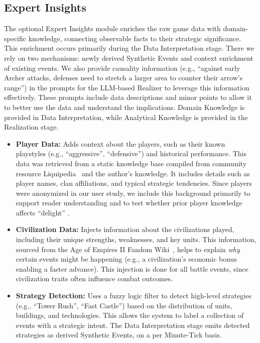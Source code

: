 \subsection{Expert Insights}
The optional Expert Insights module enriches the raw game data with domain-specific knowledge, connecting observable facts to their strategic significance. This enrichment occurs primarily during the Data Interpretation stage. There we rely on two mechanisms: newly derived Synthetic Events and context enrichment of existing events. We also provide causality information (e.g., ``against early Archer attacks, defenses need to stretch a larger area to counter their arrow's range'') in the prompts for the LLM-based Realizer to leverage this information effectively. These prompts include data descriptions and minor points to allow it to better use the data and understand the implications.
Domain Knowledge is provided in Data Interpretation, while Analytical Knowledge is provided in the Realization stage.

\begin{itemize}
  \item \textbf{Player Data:} Adds context about the players, such as their known playstyles (e.g., ``aggressive'', ``defensive'') and historical performance. This data was retrieved from a static knowledge base compiled from community resource Liquipedia~\cite{liquipedia} and the author's knowledge. It includes details such as player names, clan affiliations, and typical strategic tendencies. Since players were anonymized in our user study, we include this background primarily to support reader understanding and to test whether prior player knowledge affects ``delight'' \cite{oshimi2015}.
  \item \textbf{Civilization Data:} Injects information about the civilizations played, including their unique strengths, weaknesses, and key units. This information, sourced from the Age of Empires II Fandom Wiki~\cite{aoe2wiki}, helps to explain \textit{why} certain events might be happening (e.g., a civilization's economic bonus enabling a faster advance). This injection is done for all battle events, since civilization traits often influence combat outcomes.
  \item \textbf{Strategy Detection:} Uses a fuzzy logic filter to detect high-level strategies (e.g., ``Tower Rush'', ``Fast Castle'') based on the distribution of units, buildings, and technologies. This allows the system to label a collection of events with a strategic intent. The Data Interpretation stage emits detected strategies as derived Synthetic Events, on a per Minute-Tick basis.
\end{itemize}

